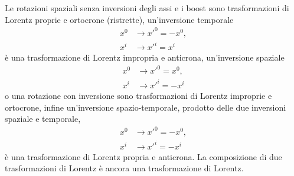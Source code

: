 Le rotazioni spaziali senza inversioni degli assi e i boost sono trasformazioni
di Lorentz proprie e ortocrone (ristrette), un'inversione temporale
\begin{subequations}
  \begin{align}
    x^{0} &\to x'^{0} = -x^{0}, \\
    x^{i} &\to x'^{i} = x^{i}
  \end{align}
\end{subequations}
è una trasformazione di Lorentz impropria e anticrona, un'inversione spaziale
\begin{subequations}
  \begin{align}
    x^{0} &\to x'^{0} = x^{0}, \\
    x^{i} &\to x'^{i} = - x^{i}
  \end{align}
\end{subequations}
o una rotazione con inversione sono trasformazioni di Lorentz improprie e
ortocrone, infine un'inversione spazio-temporale, prodotto delle due inversioni
spaziale e temporale,
\begin{subequations}
  \begin{align}
    x^{0} &\to x'^{0} = - x^{0}, \\
    x^{i} &\to x'^{i} = - x^{i}
  \end{align}
\end{subequations}
è una trasformazione di Lorentz propria e anticrona.  La composizione di due
trasformazioni di Lorentz è ancora una trasformazione di Lorentz.

\section{}
\label{sec:conseguenze-lorentz}

\subsection{}
\label{sec:contrazione-lunghezze}

\subsection{}
\label{sec:dilatazione-tempo}

